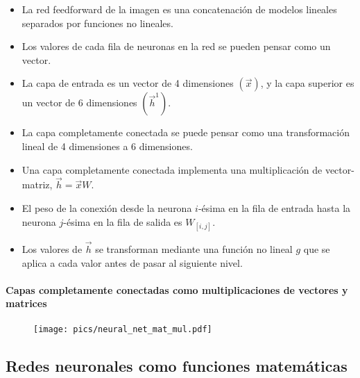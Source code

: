 \begin{itemize}
\item La red feedforward de la imagen es una concatenación de modelos lineales separados por funciones no lineales.
\item Los valores de cada fila de neuronas en la red se pueden pensar como un vector.
\item La capa de entrada es un vector de 4 dimensiones $(\vec{x})$, y la capa superior es un vector de 6 dimensiones $(\vec{h}^1)$.
\item La capa completamente conectada se puede pensar como una transformación lineal de 4 dimensiones a 6 dimensiones.
\item Una capa completamente conectada implementa una multiplicación de vector-matriz, $\vec{h}=\vec{x}W$.
\item El peso de la conexión desde la neurona $i$-ésima en la fila de entrada hasta la neurona $j$-ésima en la fila de salida es $W_{[i,j]}$.
\item Los valores de $\vec{h}$ se transforman mediante una función no lineal $g$ que se aplica a cada valor antes de pasar al siguiente nivel.

\end{itemize}


\paragraph{Capas completamente conectadas como multiplicaciones de vectores y matrices}
\begin{figure}[htb]
	\centering
	 \texttt{[image: pics/neural\_net\_mat\_mul.pdf]}
\end{figure}

\subsection{Redes neuronales como funciones matemáticas}

